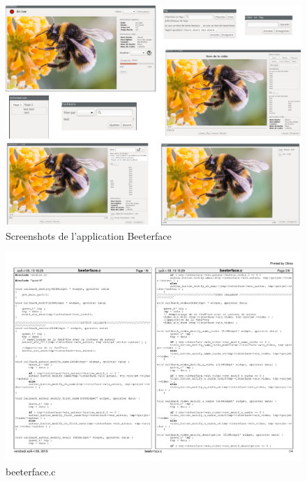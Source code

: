 \documentclass[11pt,french,a4paper]{report}
\begin{document}
\begin{landscape}
\begin{figure}
    \centering
    \includegraphics[scale=0.6]{../images/annexes/screen_appli.png}
    \caption{Screenshots de l'application Beeterface}
    \label{an2}
\end{figure}
\end{landscape}

\begin{landscape}
\begin{figure}
    \centering
    \includegraphics[scale=0.85]{../code/beeterface.pdf}
    \caption{beeterface.c}
    \label{an3}
\end{figure}
\end{landscape}
\end{document}
